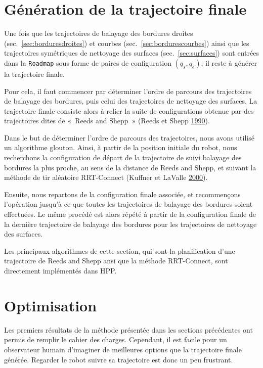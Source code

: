 \documentclass[french,A4paper,]{book}
\begin{document}
\section{Génération de la trajectoire
finale}\label{sec:trajectoirefinale}

Une fois que les trajectoires de balayage des bordures droites
(sec.~\ref{sec:borduresdroites}) et courbes
(sec.~\ref{sec:bordurescourbes}) ainsi que les trajectoires symétriques
de nettoyage des surfaces (sec.~\ref{sec:surfaces}) sont entrées dans la
\texttt{Roadmap} sous forme de paires de configuration \((q_s, q_e)\),
il reste à générer la trajectoire finale.

Pour cela, il faut commencer par déterminer l'ordre de parcours des
trajectoires de balayage des bordures, puis celui des trajectoires de
nettoyage des surfaces. La trajectoire finale consiste alors à relier la
suite de configurations obtenue par des trajectoires dites de «~Reeds
and Shepp~» (Reeds et Shepp \protect\hyperlink{ref-reedsshepp}{1990}).

Dans le but de déterminer l'ordre de parcours des trajectoires, nous
avons utilisé un algorithme glouton. Ainsi, à partir de la position
initiale du robot, nous recherchons la configuration de départ de la
trajectoire de suivi balayage des bordures la plus proche, au sens de la
distance de Reeds and Shepp, et suivant la méthode de tir aléatoire
RRT-Connect (Kuffner et LaValle \protect\hyperlink{ref-rrt}{2000}).

Ensuite, nous repartons de la configuration finale associée, et
recommençons l'opération jusqu'à ce que toutes les trajectoires de
balayage des bordures soient effectuées. Le même procédé est alors
répété à partir de la configuration finale de la dernière trajectoire de
balayage des bordures pour les trajectoires de nettoyage des surfaces.

Les principaux algorithmes de cette section, qui sont la planification
d'une trajectoire de Reeds and Shepp ansi que la méthode RRT-Connect,
sont directement implémentés dans HPP.

\section{Optimisation}\label{sec:optimisation}

Les premiers résultats de la méthode présentée dans les sections
précédentes ont permis de remplir le cahier des charges. Cependant, il
est facile pour un observateur humain d'imaginer de meilleures options
que la trajectoire finale générée. Regarder le robot suivre sa
trajectoire est donc un peu frustrant.
\end{document}
